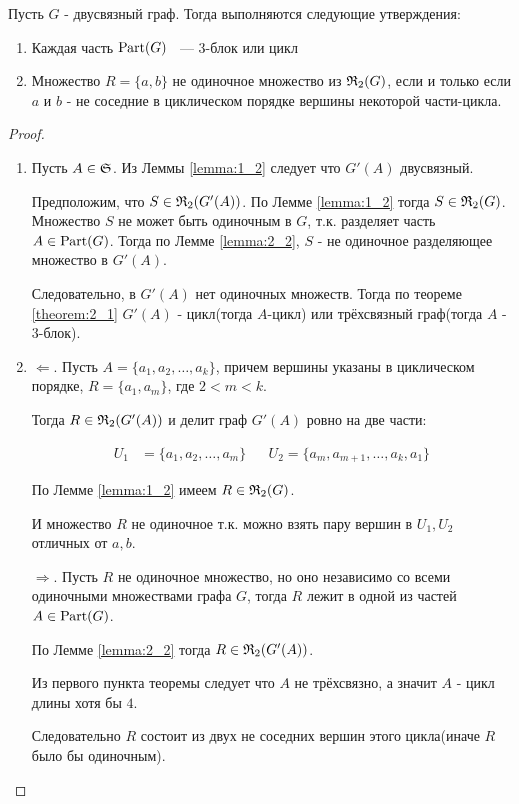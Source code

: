 \begin{thm}[Теорема 2.2] \label{theorem:2_2}
	Пусть $G$ - двусвязный граф.
	Тогда выполняются следующие утверждения:

	\begin{enumerate}
		\item Каждая часть $\Part(G)$ ~--- 3-блок или цикл
		\item Множество $R = \{a, b\}$ не одиночное множество из $\R_2(G)$, если и только если $a$ и $b$ - не соседние в циклическом порядке вершины некоторой части-цикла.
	\end{enumerate}

\end{thm}

\begin{proof}
	\begin{enumerate}
		\item Пусть $A \in \S$.
			Из Леммы \ref{lemma:1_2} следует что $G'(A)$ двусвязный.

			Предположим, что $S \in \R_2(G'(A))$.
			По Лемме \ref{lemma:1_2} тогда $S \in \R_2(G)$.
			Множество $S$ не может быть одиночным в $G$, т.к. разделяет часть $A \in \Part(G)$.
			Тогда по Лемме \ref{lemma:2_2}, $S$ - не одиночное разделяющее множество в  $G'(A)$.

			Следовательно, в  $G'(A)$ нет одиночных множеств.
			Тогда по теореме \ref{theorem:2_1} $G'(A)$ - цикл(тогда $A$-цикл) или трёхсвязный граф(тогда $A$ - 3-блок).

		\item $\Longleftarrow$. Пусть  $A = \{ a_1, a_2, \ldots, a_k \}$, причем вершины указаны в циклическом порядке, $R = \{a_1, a_m\}$, где  $2 < m < k$.

			Тогда  $R \in \R_2(G'(A))$ и делит граф  $G'(A)$ ровно на две части:

			\begin{align*}
				U_1 &= \{a_1, a_2, \ldots, a_m\} && U_2 = \{a_m, a_{m+1}, \ldots, a_k, a_1\}
			\end{align*}

			По Лемме \ref{lemma:1_2} имеем $R \in \R_2(G)$.

			И множество $R$ не одиночное т.к. можно взять пару вершин в $U_1, U_2$ отличных от $a, b$.

			$\Longrightarrow$. Пусть $R$ не одиночное множество, но оно независимо со всеми одиночными множествами графа  $G$, тогда $R$ лежит в одной из частей $A \in \Part(G)$.

			По Лемме \ref{lemma:2_2} тогда $R \in \R_2(G'(A))$.

			Из первого пункта теоремы  следует что $A$ не трёхсвязно, а значит $A$ - цикл длины хотя бы $4$.

			Следовательно  $R$ состоит из двух не соседних вершин этого цикла(иначе $R$ было бы одиночным).

	\end{enumerate}
\end{proof}



